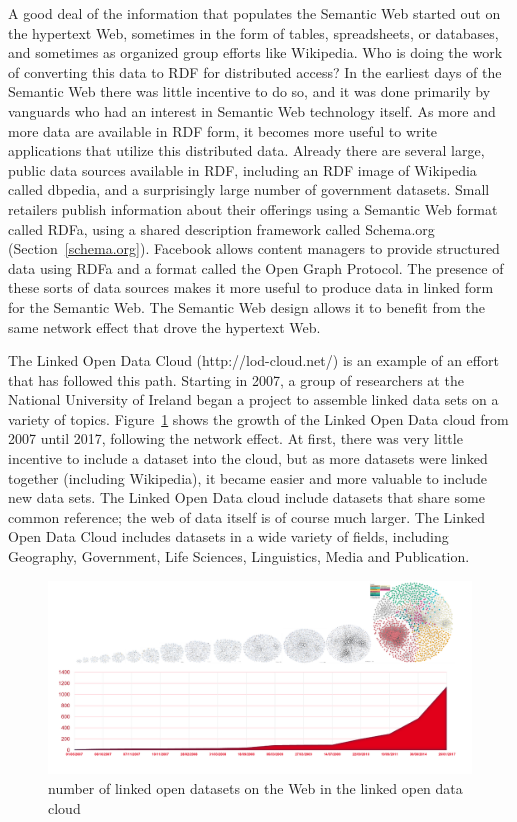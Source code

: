 A good deal of the information that populates the Semantic Web started
out on the hypertext Web, sometimes in the form of tables, spreadsheets,
or databases, and sometimes as organized group efforts like Wikipedia.
Who is doing the work of converting this data to RDF for distributed
access? In the earliest days of the Semantic Web there was little
incentive to do so, and it was done primarily by vanguards who had an
interest in Semantic Web technology itself. As more and more data are
available in RDF form, it becomes more useful to write applications that
utilize this distributed data. Already there are several large, public
data sources available in RDF, including an RDF image of Wikipedia
called dbpedia, and a surprisingly large number of government datasets.
Small retailers publish information about their offerings using a
Semantic Web format called RDFa, using a shared description framework called Schema.org (Section~\ref{schema.org}). 
Facebook allows content managers to
provide structured data using RDFa and a format called the Open Graph
Protocol. The presence of these sorts of data sources makes it more
useful to produce data in linked form for the Semantic Web. The Semantic
Web design allows it to benefit from the same network effect that drove
the hypertext Web.

The Linked Open Data Cloud (http://lod-cloud.net/) is an example of an
effort that has followed this path. Starting in 2007, a group of
researchers at the National University of Ireland began a project to
assemble linked data sets on a variety of topics. Figure~\ref{fig:ch1.1} shows the
growth of the Linked Open Data cloud from 2007 until 2017, following the
network effect. At first, there was very little incentive to include a
dataset into the cloud, but as more datasets were linked together
(including Wikipedia), it became easier and more valuable to include new
data sets. The Linked Open Data cloud include datasets that share some
common reference; the web of data itself is of course much larger. The
Linked Open Data Cloud includes datasets in a wide variety of fields,
including Geography, Government, Life Sciences, Linguistics, Media and
Publication.

\begin{figure}
    \centering
    \includegraphics[width=5.0in]{media/image1.png}
    \caption{number of linked open datasets on the Web in the linked open
data cloud}
    \label{fig:ch1.1}
\end{figure}


